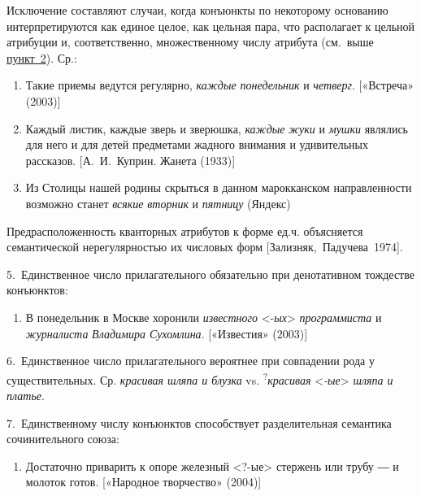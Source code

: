 Исключение составляют случаи, когда конъюнкты по некоторому основанию
интерпретируются как единое целое, как цельная пара, что располагает к
цельной атрибуции и, соответственно, множественному числу атрибута
(см.~выше \underline{пункт~2}). Ср.:

\begin{enumerate}
\def\labelenumi{(\arabic{enumi})}
\setcounter{enumi}{137}
\item
  Такие приемы ведутся регулярно, \textit{каждые понедельник} и
  \textit{четверг}. {[}«Встреча» (2003){]}
\item
  Каждый листик, каждые зверь и зверюшка, \textit{каждые} \textit{жуки} и
  \textit{мушки} являлись для него и для детей предметами жадного внимания
  и удивительных рассказов. {[}А.~И.~Куприн. Жанета (1933){]}
\item
  Из Столицы нашей родины скрыться в данном марокканском направленности
  возможно станет \textit{всякие} \textit{вторник} и \textit{пятницу} (Яндекс)
\end{enumerate}

Предрасположенность кванторных атрибутов к форме ед.ч. объясняется
семантической нерегулярностью их числовых форм
{[}Зализняк,~Падучева~1974{]}.

5.~Единственное число прилагательного обязательно при денотативном
тождестве конъюнктов:

\begin{enumerate}
\def\labelenumi{(\arabic{enumi})}
\setcounter{enumi}{140}
\item
  В понедельник в Москве хоронили \textit{известного}
  \textless*-\textit{ых}\textgreater{} \textit{программиста} и
  \textit{журналиста} \textit{Владимира Сухомлина}. {[}«Известия» (2003){]}
\end{enumerate}

6.~Единственное число прилагательного вероятнее при совпадении рода у
существительных. Ср. \textit{красивая шляпа и блузка} vs.
\textsuperscript{?}\textit{красивая} \textless{}\textit{-ые}\textgreater{}
\textit{шляпа и платье}.

7.~Единственному числу конъюнктов способствует разделительная семантика
сочинительного союза:

\begin{enumerate}
\def\labelenumi{(\arabic{enumi})}
\setcounter{enumi}{141}
\item
  Достаточно приварить к опоре железный \textless?-ые\textgreater{}
  стержень или трубу ― и молоток готов. {[}«Народное творчество»
  (2004){]}
\end{enumerate}

